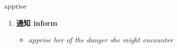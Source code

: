 
\begin{frame}
{\huge apprise}
\begin{center}
\begin{enumerate}\Large
  \item \textbf{通知 inform}
  \begin{itemize}
    \item \em{\Large{apprise her of the danger she might encounter}}
  \end{itemize}
\end{enumerate}
\end{center}
\end{frame}
